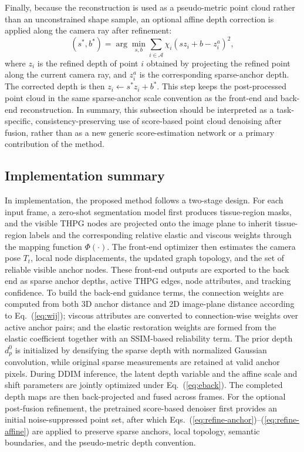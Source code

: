 \documentclass[pdflatex,sn-mathphys-num]{sn-jnl}
\begin{document}
Finally, because the reconstruction is used as a pseudo-metric point cloud rather than an unconstrained shape sample, an optional affine depth correction is applied along the camera ray after refinement:
\begin{equation}
(s^{*},b^{*}) = \arg\min_{s,b}\sum_{i\in\mathcal{A}}\chi_i\left(s z_i+b-z_i^{a}\right)^2,
\label{eq:refine-affine}
\end{equation}
where \(z_i\) is the refined depth of point \(i\) obtained by projecting the refined point along the current camera ray, and \(z_i^{a}\) is the corresponding sparse-anchor depth. The corrected depth is then \(z_i\leftarrow s^{*}z_i+b^{*}\). This step keeps the post-processed point cloud in the same sparse-anchor scale convention as the front-end and back-end reconstruction. In summary, this subsection should be interpreted as a task-specific, consistency-preserving use of score-based point cloud denoising after fusion, rather than as a new generic score-estimation network or a primary contribution of the method.

\subsection{Implementation summary}\label{subsec:implementation}

In implementation, the proposed method follows a two-stage design. For each input frame, a zero-shot segmentation model first produces tissue-region masks, and the visible THPG nodes are projected onto the image plane to inherit tissue-region labels and the corresponding relative elastic and viscous weights through the mapping function $\Phi(\cdot)$. The front-end optimizer then estimates the camera pose $T_t$, local node displacements, the updated graph topology, and the set of reliable visible anchor nodes. These front-end outputs are exported to the back end as sparse anchor depths, active THPG edges, node attributes, and tracking confidence. To build the back-end guidance terms, the connection weights are computed from both 3D anchor distance and 2D image-plane distance according to Eq.~(\ref{eq:wij}); viscous attributes are converted to connection-wise weights over active anchor pairs; and the elastic restoration weights are formed from the elastic coefficient together with an SSIM-based reliability term. The prior depth $d_p^0$ is initialized by densifying the sparse depth with normalized Gaussian convolution, while original sparse measurements are retained at valid anchor pixels. During DDIM inference, the latent depth variable and the affine scale and shift parameters are jointly optimized under Eq.~(\ref{eq:eback}). The completed depth maps are then back-projected and fused across frames. For the optional post-fusion refinement, the pretrained score-based denoiser first provides an initial noise-suppressed point set, after which Eqs.~(\ref{eq:refine-anchor})--(\ref{eq:refine-affine}) are applied to preserve sparse anchors, local topology, semantic boundaries, and the pseudo-metric depth convention.
\end{document}
